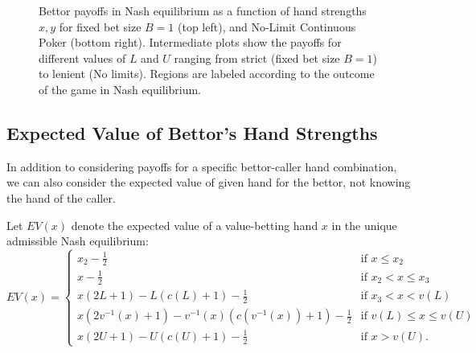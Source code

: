 \documentclass[../../main/main.tex]{subfiles}
\begin{document}
\begin{figure}[p]
\begin{adjustwidth}{-1.25in}{-1.25in}
\begin{minipage}{0.4\textwidth}
        \end{minipage}
    \end{adjustwidth}
    \caption{Bettor payoffs in Nash equilibrium as a function of hand strengths $x, y$ for fixed bet size $B=1$ (top left), and No-Limit Continuous Poker (bottom right). Intermediate plots show the payoffs for different values of $L$ and $U$ ranging from strict (fixed bet size $B=1$) to lenient (No limits). Regions are labeled according to the outcome of the game in Nash equilibrium.}
    \label{fig:payoffs}
\end{figure}

\restoregeometry


\subsection{Expected Value of Bettor's Hand Strengths}
\label{bettor_ev}

In addition to considering payoffs for a specific bettor-caller hand combination, we can also consider the expected value of given hand for the bettor, not knowing the hand of the caller. 

\begin{theorem}
    \label{thm:ev_bettor}
    Let $EV(x)$ denote the expected value of a value-betting hand $x$ in the unique admissible Nash equilibrium:
    \begin{equation}
        EV(x) = \begin{cases}
            x_2-\frac{1}{2} & \text{if } x \leq x_2 \\
            x-\frac{1}{2} & \text{if } x_2 < x \le x_3 \\
            x(2L + 1) - L(c(L) + 1) - \frac{1}{2} & \text{if } x_3 < x < v(L) \\
            x(2v^{-1}(x) + 1) - v^{-1}(x)(c(v^{-1}(x)) + 1) - \frac{1}{2} & \text{if } v(L) \leq x \leq v(U) \\
            x(2U + 1) - U(c(U) + 1) - \frac{1}{2} & \text{if } x > v(U).
        \end{cases}
    \end{equation}
\end{theorem}
\end{document}
